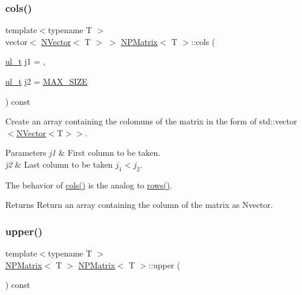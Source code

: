 \subsubsection{\texorpdfstring{cols()}{cols()}}
{\footnotesize\ttfamily template$<$typename T $>$ \\
vector$<$ \mbox{\hyperlink{class_n_vector}{N\+Vector}}$<$ T $>$ $>$ \mbox{\hyperlink{class_n_p_matrix}{N\+P\+Matrix}}$<$ T $>$\+::cols (\begin{DoxyParamCaption}\item[{\mbox{\hyperlink{typedef_8h_a1b140a2034db3f5dfe18a987745df43a}{ul\+\_\+t}}}]{j1 = {},  }\item[{\mbox{\hyperlink{typedef_8h_a1b140a2034db3f5dfe18a987745df43a}{ul\+\_\+t}}}]{j2 = {\ttfamily \mbox{\hyperlink{_n_vector_8h_a0592dba56693fad79136250c11e5a7fe}{M\+A\+X\+\_\+\+S\+I\+ZE}}} }\end{DoxyParamCaption}) const}



Create an array containing the colomuns of the matrix in the form of {\ttfamily std\+::vector$<$\mbox{\hyperlink{class_n_vector}{N\+Vector}}$<$T$>$$>$}. 


\begin{DoxyParams}{Parameters}
{\em j1} & First column to be taken. \\
\hline
{\em j2} & Last column to be taken $ j_1 \lt j_2 $.\\
\hline
\end{DoxyParams}
The behavior of {\ttfamily \mbox{\hyperlink{class_n_p_matrix_a30c8ad7b415fa92a23375cbad3ee8e37}{cols()}}} is the analog to {\ttfamily \mbox{\hyperlink{class_n_p_matrix_add861e9e1df81af2546c3eab1fd40d51}{rows()}}}.

\begin{DoxyReturn}{Returns}
Return an array containing the column of the matrix as {\ttfamily Nvector}. 
\end{DoxyReturn}
\mbox{\label{class_n_p_matrix_a986376cd2765f1864fdac8b264f454ef}} 
\subsubsection{\texorpdfstring{upper()}{upper()}}
{\footnotesize\ttfamily template$<$typename T $>$ \\
\mbox{\hyperlink{class_n_p_matrix}{N\+P\+Matrix}}$<$ T $>$ \mbox{\hyperlink{class_n_p_matrix}{N\+P\+Matrix}}$<$ T $>$\+::upper (\begin{DoxyParamCaption}{ }\end{DoxyParamCaption}) const}



